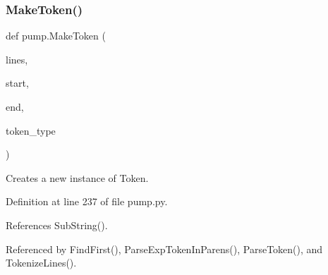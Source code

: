 \mbox{\label{namespacepump_af96d60dc97b160f3a18e63857aabeef7}} 
\subsubsection{\texorpdfstring{Make\+Token()}{MakeToken()}}
{\footnotesize\ttfamily def pump.\+Make\+Token (\begin{DoxyParamCaption}\item[{}]{lines,  }\item[{}]{start,  }\item[{}]{end,  }\item[{}]{token\+\_\+type }\end{DoxyParamCaption})}

\begin{DoxyVerb}Creates a new instance of Token.\end{DoxyVerb}
 

Definition at line 237 of file pump.\+py.



References Sub\+String().



Referenced by Find\+First(), Parse\+Exp\+Token\+In\+Parens(), Parse\+Token(), and Tokenize\+Lines().


